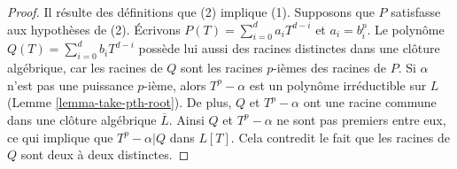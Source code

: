 \begin{proof}
Il résulte des définitions que (2) implique (1). Supposons que $P$ satisfasse aux hypothèses de (2).
Écrivons $P(T) = \sum\nolimits_{i = 0}^d a_i T^{d - i}$ et $a_i = b_i^p$.
Le polynôme $Q(T) = \sum\nolimits_{i = 0}^d b_i T^{d - i}$ possède lui aussi des
racines distinctes dans une clôture algébrique, car les racines de $Q$
sont les racines $p$-ièmes des racines de $P$. Si $\alpha$ n'est pas une puissance $p$-ième,
alors $T^p - \alpha$ est un polynôme irréductible sur $L$
(Lemme \ref{lemma-take-pth-root}).
De plus, $Q$ et $T^p - \alpha$ ont une racine commune dans
une clôture algébrique $\overline{L}$.
Ainsi $Q$ et $T^p - \alpha$ ne sont pas premiers entre eux, ce qui
implique que $T^p - \alpha | Q$ dans $L[T]$. Cela contredit le fait que
les racines de $Q$ sont deux à deux distinctes.
\end{proof}

















